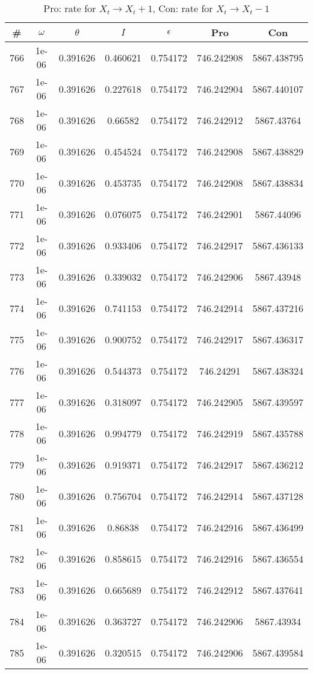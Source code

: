 \newpage
\begin{table}
\caption{Pro: rate for $X_t \rightarrow X_t + 1$, Con: rate for $X_t \rightarrow X_t - 1$}
\begin{tabular*}{\linewidth}{c|c|c|c|c|c|c}
\# & $\omega$ & $\theta$ & $I$ & $\epsilon$ & Pro & Con \\
\hline
766 & 1e-06 & 0.391626 & 0.460621 & 0.754172 & 746.242908 & 5867.438795\\
767 & 1e-06 & 0.391626 & 0.227618 & 0.754172 & 746.242904 & 5867.440107\\
768 & 1e-06 & 0.391626 & 0.66582 & 0.754172 & 746.242912 & 5867.43764\\
769 & 1e-06 & 0.391626 & 0.454524 & 0.754172 & 746.242908 & 5867.438829\\
770 & 1e-06 & 0.391626 & 0.453735 & 0.754172 & 746.242908 & 5867.438834\\
771 & 1e-06 & 0.391626 & 0.076075 & 0.754172 & 746.242901 & 5867.44096\\
772 & 1e-06 & 0.391626 & 0.933406 & 0.754172 & 746.242917 & 5867.436133\\
773 & 1e-06 & 0.391626 & 0.339032 & 0.754172 & 746.242906 & 5867.43948\\
774 & 1e-06 & 0.391626 & 0.741153 & 0.754172 & 746.242914 & 5867.437216\\
775 & 1e-06 & 0.391626 & 0.900752 & 0.754172 & 746.242917 & 5867.436317\\
776 & 1e-06 & 0.391626 & 0.544373 & 0.754172 & 746.24291 & 5867.438324\\
777 & 1e-06 & 0.391626 & 0.318097 & 0.754172 & 746.242905 & 5867.439597\\
778 & 1e-06 & 0.391626 & 0.994779 & 0.754172 & 746.242919 & 5867.435788\\
779 & 1e-06 & 0.391626 & 0.919371 & 0.754172 & 746.242917 & 5867.436212\\
780 & 1e-06 & 0.391626 & 0.756704 & 0.754172 & 746.242914 & 5867.437128\\
781 & 1e-06 & 0.391626 & 0.86838 & 0.754172 & 746.242916 & 5867.436499\\
782 & 1e-06 & 0.391626 & 0.858615 & 0.754172 & 746.242916 & 5867.436554\\
783 & 1e-06 & 0.391626 & 0.665689 & 0.754172 & 746.242912 & 5867.437641\\
784 & 1e-06 & 0.391626 & 0.363727 & 0.754172 & 746.242906 & 5867.43934\\
785 & 1e-06 & 0.391626 & 0.320515 & 0.754172 & 746.242906 & 5867.439584\\

\end{tabular*}
\end{table}
